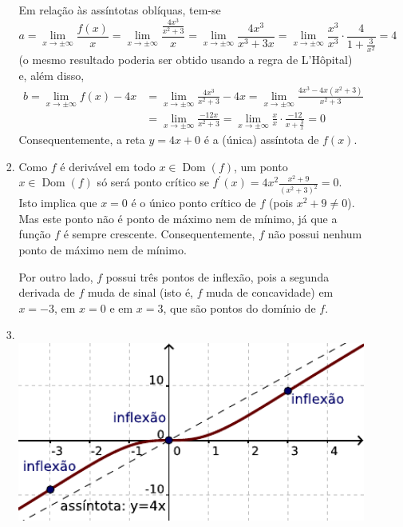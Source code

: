 \documentclass[12pt,a4paper]{article}
\newcommand*\dom[1]{\operatorname{Dom}\left(#1\right)}
\begin{document}
\begin{enumerate}
\begin{itemize}
\begin{enumerate}
Em relação às assíntotas oblíquas, tem-se
\[
a = \lim_{x\to \pm\infty} \frac{f(x)}{x}
= \lim_{x\to \pm\infty} \frac{\frac{4x^3}{x^2+3}}{x}
= \lim_{x\to \pm\infty} \frac{4x^3}{x^3+3x}
= \lim_{x\to \pm\infty} \frac{x^3}{x^3} \cdot \frac{4}{1+\frac{3}{x^2}}
= 4
\]
(o mesmo resultado poderia ser obtido usando a regra de L'Hôpital) e, além disso,
\begin{align*}
b = \lim_{x\to \pm\infty} f(x) - 4x
& = \lim_{x\to \pm\infty} \frac{4x^3}{x^2+3} - 4x
  = \lim_{x\to \pm\infty} \frac{4x^3 - 4x(x^2+3)}{x^2+3} \\
& = \lim_{x\to \pm\infty} \frac{-12x}{x^2+3}
  = \lim_{x\to \pm\infty} \frac{x}{x} \cdot \frac{-12}{x+\frac{3}{x}}
  = 0
\end{align*}
Consequentemente, a reta $y = 4x + 0$ é a (única) assíntota de $f(x)$.

\item Como $f$ é derivável em todo $x \in \dom{f}$, um ponto $x \in \dom{f}$ só será ponto crítico se $f^\prime(x) = 4x^2\frac{x^2 + 9}{(x^2+3)^2} = 0$. Isto implica que $x = 0$ é o único ponto crítico de $f$ (pois $x^2+9 \neq 0$). Mas este ponto não é ponto de máximo nem de mínimo, já que a função $f$ é sempre crescente. Consequentemente, $f$ não possui nenhum ponto de máximo nem de mínimo.

Por outro lado, $f$ possui três pontos de inflexão, pois a segunda derivada de $f$ muda de sinal (isto é, $f$ muda de concavidade) em $x = -3$, em $x=0$ e em $x = 3$, que são pontos do domínio de $f$.
\item \text{}\\
\includegraphics[width=14cm]{img/prova-3-tads-2a-racional}


\end{enumerate}
\end{itemize}
\end{enumerate}
\end{document}
